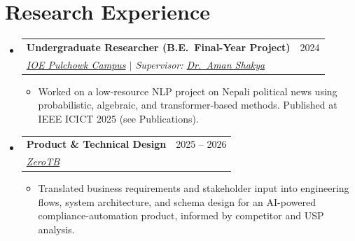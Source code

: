 \documentclass[letterpaper,11pt]{article}
\makeatletter
\newcommand{\resumeItem}[1]{
  \item\small{
    {#1 \vspace{-2pt}}
  }
}
\newcommand{\resumeSubheading}[4]{
  \vspace{-2pt}\item
    \begin{tabular*}{0.97\textwidth}[t]{l@{\extracolsep{\fill}}r}
      \textbf{#1} & #2 \\
      \textit{\small#3} & \textit{\small #4} \\
    \end{tabular*}\vspace{-7pt}
}
\newcommand{\resumeSubHeadingListStart}{\begin{itemize}[leftmargin=0.15in, label={}]}
\newcommand{\resumeSubHeadingListEnd}{\end{itemize}}
\newcommand{\resumeItemListStart}{\begin{itemize}}
\newcommand{\resumeItemListEnd}{\end{itemize}\vspace{-5pt}}
\makeatother
\begin{document}
\section{Research Experience}
\resumeSubHeadingListStart
\resumeSubheading
{Undergraduate Researcher (B.E.\ Final-Year Project)}{2024}
{\href{https://pcampus.edu.np/}{IOE Pulchowk Campus} $|$ Supervisor: \href{https://www.amanshakya.com.np/}{Dr.\ Aman Shakya}}{}
\resumeItemListStart
    \resumeItem{Worked on a low-resource NLP project on Nepali political news using probabilistic, algebraic, and transformer-based methods. Published at IEEE ICICT 2025 (see Publications).}
\resumeItemListEnd
\resumeSubheading
{Product \& Technical Design}{2025 -- 2026}
{\href{https://zerotb.ai}{ZeroTB}}{}
\resumeItemListStart
    \resumeItem{Translated business requirements and stakeholder input into engineering flows, system architecture, and schema design for an AI-powered compliance-automation product, informed by competitor and USP analysis.}
\resumeItemListEnd
\resumeSubHeadingListEnd

\end{document}
